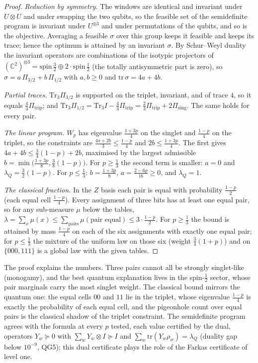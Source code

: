 \documentclass[11pt]{article}
\theoremstyle{definition}\newtheorem{definition}[theorem]{Definition}\newtheorem{remark}[theorem]{Remark}\newtheorem{example}[theorem]{Example}
\begin{document}
\begin{proof}
\emph{Reduction by symmetry.} The windows are identical and invariant under $U\otimes U$ and under swapping the two qubits, so the feasible
set of the semidefinite program is invariant under $U^{\otimes3}$ and under permutations of the qubits, and so is the objective. Averaging a
feasible $\sigma$ over this group keeps it feasible and keeps its trace; hence the optimum is attained by an invariant $\sigma$. By Schur--Weyl
duality the invariant operators are combinations of the isotypic projectors of $(\mathbb C^2)^{\otimes3}=\mathrm{spin}\,\tfrac32\oplus2\cdot
\mathrm{spin}\,\tfrac12$ (the totally antisymmetric part is zero), so $\sigma=a\,\Pi_{3/2}+b\,\Pi_{1/2}$ with $a,b\ge0$ and
$\mathrm{tr}\,\sigma=4a+4b$.

\emph{Partial traces.} $\mathrm{Tr}_3\Pi_{3/2}$ is supported on the triplet, invariant, and of trace $4$, so it equals $\tfrac43\Pi_{\mathrm{trip}}$;
and $\mathrm{Tr}_3\Pi_{1/2}=\mathrm{Tr}_3I-\tfrac43\Pi_{\mathrm{trip}}=\tfrac23\Pi_{\mathrm{trip}}+2\Pi_{\mathrm{sing}}$. The same holds for every pair.

\emph{The linear program.} $W_p$ has eigenvalue $\tfrac{1+3p}4$ on the singlet and $\tfrac{1-p}4$ on the triplet, so the constraints are
$\tfrac{4a+2b}3\le\tfrac{1-p}4$ and $2b\le\tfrac{1+3p}4$. The first gives $4a+4b\le\tfrac34(1-p)+2b$, maximised by the largest admissible
$b=\min\big(\tfrac{1+3p}8,\tfrac38(1-p)\big)$. For $p\ge\tfrac13$ the second term is smaller: $a=0$ and $\lambda_Q=\tfrac32(1-p)$. For
$p\le\tfrac13$: $b=\tfrac{1+3p}8$, $a=\tfrac{2-6p}{16}\ge0$, and $\lambda_Q=1$.

\emph{The classical fraction.} In the $Z$ basis each pair is equal with probability $\tfrac{1-p}2$ (each equal cell $\tfrac{1-p}4$). Every
assignment of three bits has at least one equal pair, so for any sub-measure $\mu$ below the tables,
$\lambda=\sum_x\mu(x)\le\sum_{\text{pairs}}\mu(\text{pair equal})\le3\cdot\tfrac{1-p}2$. For $p\ge\tfrac13$ the bound is attained by mass
$\tfrac{1-p}4$ on each of the six assignments with exactly one equal pair; for $p\le\tfrac13$ the mixture of the uniform law on those six (weight
$\tfrac34(1+p)$) and on $\{000,111\}$ is a global law with the given tables.
\end{proof}

The proof explains the numbers. Three pairs cannot all be strongly singlet-like (monogamy), and the best quantum explanation lives in the
spin-$\tfrac12$ sector, whose pair marginals carry the most singlet weight. The classical bound mirrors the quantum one: the equal cells $00$ and $11$
lie in the triplet, whose eigenvalue $\tfrac{1-p}4$ is exactly the probability of each equal cell, and the pigeonhole count over equal pairs
is the classical shadow of the triplet constraint. The semidefinite program agrees with the formula at every $p$ tested, each
value certified by the dual, operators $Y_w\succeq0$ with $\sum_wY_w\otimes I\succeq I$ and $\sum_w\mathrm{tr}(Y_w\rho_w)=\lambda_Q$ (duality gap
below $10^{-9}$, QG5); this dual certificate plays the role of the Farkas certificate of level one.
\end{document}
